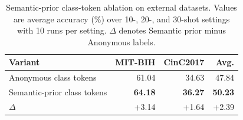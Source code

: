 \begin{table}[t]
\centering
\caption{Semantic-prior class-token ablation on external datasets. Values are average accuracy (\%) over 10-, 20-, and 30-shot settings with 10 runs per setting. $\Delta$ denotes Semantic prior minus Anonymous labels.}
\label{tab:semantic-prior-summary}
\begin{tabular}{lrrr}
\toprule
Variant & MIT-BIH & CinC2017 & Avg. \\
\midrule
Anonymous class tokens & 61.04 & 34.63 & 47.84 \\
Semantic-prior class tokens & \textbf{64.18} & \textbf{36.27} & \textbf{50.23} \\
\midrule
$\Delta$ & +3.14 & +1.64 & +2.39 \\
\bottomrule
\end{tabular}
\end{table}
